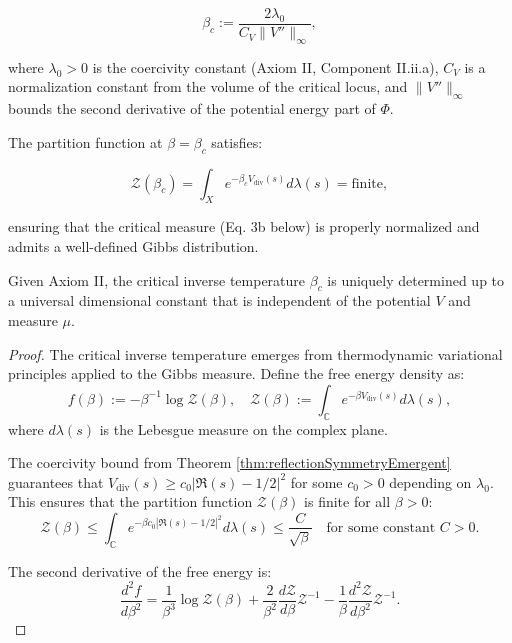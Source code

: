 \begin{theorem}
\begin{enumerate}
\begin{definition}
\[\beta_c := \frac{2\lambda_0}{C_V \|V''\|_{\infty}},\]

where $\lambda_0 > 0$ is the coercivity constant (Axiom II, Component II.ii.a), $C_V$ is a normalization constant from the volume of the critical locus, and $\|V''\|_{\infty}$ bounds the second derivative of the potential energy part of $\Phi$.

The partition function at $\beta = \beta_c$ satisfies:

\[\mathcal{Z}(\beta_c) = \int_X e^{-\beta_c V_{\mathrm{div}}(s)} d\lambda(s) = \text{finite},\]

ensuring that the critical measure (Eq. 3b below) is properly normalized and admits a well-defined Gibbs distribution.

\end{definition}

\begin{lemma}
\label{lem:criticalTemperatureUniqueness}

Given Axiom II, the critical inverse temperature $\beta_c$ is uniquely determined up to a universal dimensional constant that is independent of the potential $V$ and measure $\mu$.

\begin{proof}
The critical inverse temperature emerges from thermodynamic variational principles applied to the Gibbs measure. Define the free energy density as:
\[f(\beta) := -\beta^{-1} \log \mathcal{Z}(\beta), \quad \mathcal{Z}(\beta) := \int_{\mathbb{C}} e^{-\beta V_{\mathrm{div}}(s)} d\lambda(s),\]
where $d\lambda(s)$ is the Lebesgue measure on the complex plane.

The coercivity bound from Theorem \ref{thm:reflectionSymmetryEmergent} guarantees that $V_{\mathrm{div}}(s) \geq c_0 |\Re(s) - 1/2|^2$ for some $c_0 > 0$ depending on $\lambda_0$. This ensures that the partition function $\mathcal{Z}(\beta)$ is finite for all $\beta > 0$:
\[\mathcal{Z}(\beta) \leq \int_{\mathbb{C}} e^{-\beta c_0 |\Re(s)-1/2|^2} d\lambda(s) \leq \frac{C}{\sqrt{\beta}} \quad \text{for some constant } C > 0.\]

The second derivative of the free energy is:
\[\frac{d^2 f}{d\beta^2} = \frac{1}{\beta^3}\log\mathcal{Z}(\beta) + \frac{2}{\beta^2}\frac{d\mathcal{Z}}{d\beta}\mathcal{Z}^{-1} - \frac{1}{\beta}\frac{d^2\mathcal{Z}}{d\beta^2}\mathcal{Z}^{-1}.\]


\end{proof}
\end{lemma}
\end{enumerate}
\end{theorem}
